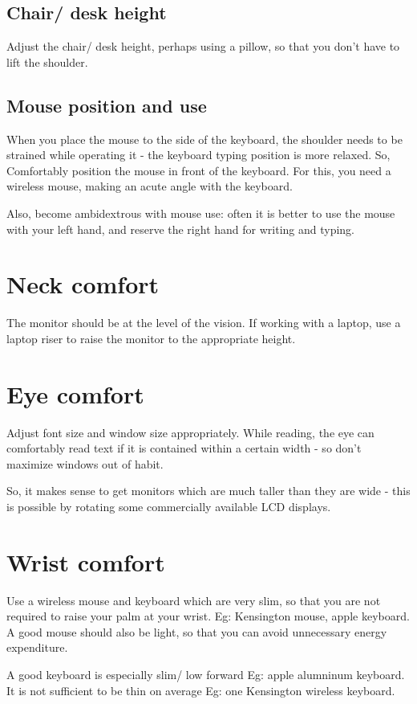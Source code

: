 \documentclass[oneside, article]{memoir}
\begin{document}
\subsection{Chair/ desk height}
Adjust the chair/ desk height, perhaps using a pillow, so that you don't have to lift the shoulder.

\subsection{Mouse position and use}
When you place the mouse to the side of the keyboard, the shoulder needs to be strained while operating it - the keyboard typing position is more relaxed. So, Comfortably position the mouse in front of the keyboard. For this, you need a wireless mouse, making an acute angle with the keyboard.

Also, become ambidextrous with mouse use: often it is better to use the mouse with your left hand, and reserve the right hand for writing and typing.

\section{Neck comfort}
The monitor should be at the level of the vision. If working with a laptop, use a laptop riser to raise the monitor to the appropriate height.

\section{Eye comfort}
Adjust font size and window size appropriately. While reading, the eye can comfortably read text if it is contained within a certain width - so don't maximize windows out of habit.

So, it makes sense to get monitors which are much taller than they are wide - this is possible by rotating some commercially available LCD displays.

\section{Wrist comfort}
Use a wireless mouse and keyboard which are very slim, so that you are not required to raise your palm at your wrist. Eg: Kensington mouse, apple keyboard. A good mouse should also be light, so that you can avoid unnecessary energy expenditure.

A good keyboard is especially slim/ low forward Eg: apple alumninum keyboard. It is not sufficient to be thin on average Eg: one Kensington wireless keyboard.
\end{document}
